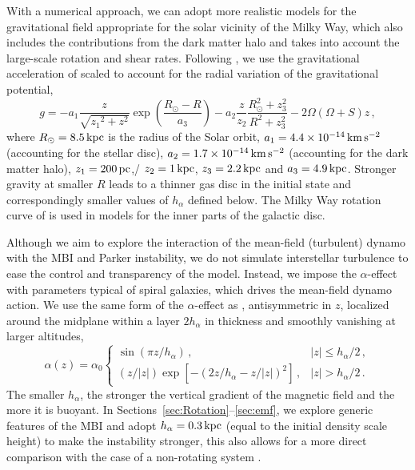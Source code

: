 \documentclass[fleqn,usenatbib]{mnras}
\newcommand{\km}{\,{\rm km}}    %
\newcommand{\p}{\,{\rm pc}}     %
\newcommand{\kpc}{\,{\rm kpc}}  %
\newcommand{\s}{\,{\rm s}}      %
\begin{document}
With a numerical approach, we can adopt more realistic models for the
gravitational field appropriate for the solar vicinity of the Milky Way, which
also includes the contributions from the dark matter halo and takes into
account the large-scale rotation and shear rates. Following
\citet{Ferriere_1998}, we use the gravitational acceleration of
\citet{K&G1989MNRAS} scaled to account for the radial variation of the
gravitational potential,
\begin{equation}
    g =-a_1\frac{{z}}{\sqrt{{z_1}^2+z^2}}\exp{\left(\dfrac{{R_{\odot}-R}}{a_3}\right)} -a_2{\frac{z}{z_2}}\dfrac{R^2_{\odot}+z_3^2}{R^2+z_3^2}
    - 2\Omega(\Omega+S)z\,,
    \label{eq:acceleration}
\end{equation}
where $R_\odot=8.5\kpc$ is the radius of the Solar orbit, $a_1 = 4.4 \times
10^{-14}\km\s^{-2}$ (accounting for the stellar disc), $a_2= 1.7\times 10^{-14}
\km\s^{-2}$ (accounting for the dark matter halo), $z_1=200\p$,/ $z_2=1\kpc$,
$z_3 = 2.2\kpc$ and $a_3 = 4.9\kpc$.  Stronger gravity at smaller $R$ leads to
a thinner gas disc in the initial state and correspondingly smaller values of
$h_\alpha$ defined below. The Milky Way rotation curve of \citet{1985Clemens}
is used in models for the inner parts of the galactic disc.

Although we aim to explore the interaction of the mean-field (turbulent) dynamo
with the MBI and Parker instability, we do not simulate interstellar turbulence
to ease the control and transparency of the model. Instead, we impose the
$\alpha$-effect with parameters typical of spiral galaxies, which drives the
mean-field dynamo action. We use the same form of the $\alpha$-effect as
\cite{QSTGB23}, antisymmetric in $z$, localized around the midplane within a
layer $2h_{\alpha}$ in thickness and smoothly vanishing at larger altitudes,
\begin{equation}
    \label{eq:alpha}
    \alpha(z)=\alpha_0
    \begin{cases}
    \displaystyle
    \sin \left(\pi z/h_\alpha\right)\,, &|z| \leq h_\alpha/2\,,\\
    \displaystyle
    (z/|z|) \exp \left[-\left(2z/h_\alpha-z/|z|\right)^2\right]\,, &|z|>h_\alpha/2\,.
    \end{cases}
\end{equation}
The smaller $h_{\alpha}$, the stronger the vertical gradient of the magnetic
field and the more it is buoyant.  In
Sections~\ref{sec:Rotation}--\ref{sec:emf}, we explore generic features of the
MBI and adopt $h_{\alpha} = 0.3 \kpc$ (equal to the initial density scale
height) to make the instability stronger, this also allows for a more direct
comparison with the case of a non-rotating system \citep{QSTGB23}.
\end{document}
